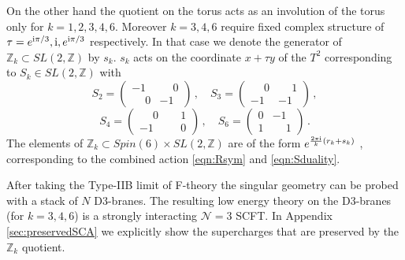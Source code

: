 \documentclass[main.tex]{subfiles}
\begin{document}
On the other hand the quotient on the torus acts as an involution of the torus only for $k=1,2,3,4,6$. Moreover $k=3,4,6$ require fixed complex structure of $\tau=e^{\mathrm{i}\pi/3},\mathrm{i},e^{\mathrm{i}\pi/3}$ respectively. In that case we denote the generator of $\mathbb{Z}_k\subset SL(2,\mathbb{Z})$ by $s_k$. $s_k$ acts on the coordinate $x+\tau y$ of the $T^2$ corresponding to $S_k\in SL(2,\mathbb{Z})$ with
\begin{equation}\label{eqn:Sduality}
S_2=\begin{pmatrix}
-1&\phantom{-}0\\
\phantom{-}0&-1
\end{pmatrix}\,,\quad S_3=\begin{pmatrix}
\phantom{-}0&\phantom{-}1\\
-1&-1
\end{pmatrix}\,,
\end{equation}
\begin{equation}
S_4=\begin{pmatrix}
\phantom{-}0&\phantom{-}1\\
-1&\phantom{-}0
\end{pmatrix}\,,\quad S_6=\begin{pmatrix}
0&-1\\
1&\phantom{-}1
\end{pmatrix}\,.
\end{equation}
The elements of $\mathbb{Z}_k\subset Spin(6)\times SL(2,\mathbb{Z})$ are of the form $e^{\frac{2\pi\mathrm{i}}{k}(r_k+ s_k)}$ , corresponding to the combined action \eqref{eqn:Rsym} and \eqref{eqn:Sduality}.

After taking the Type-IIB limit of F-theory the singular geometry can be probed with a stack of $N$ D3-branes. The resulting low energy theory on the D3-branes (for $k=3,4,6$) is a strongly interacting $\mathcal{N}=3$ SCFT. In Appendix \ref{sec:preservedSCA} we explicitly show the supercharges that are preserved by the $\mathbb{Z}_k$ quotient.
\end{document}
